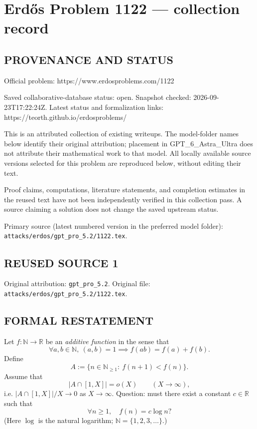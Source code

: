 \section*{Erd\H{o}s Problem 1122 --- collection record}

\subsection*{PROVENANCE AND STATUS}
Official problem: https://www.erdosproblems.com/1122

Saved collaborative-database status: open.
Snapshot checked: 2026-09-23T17:22:24Z.
Latest status and formalization links: https://teorth.github.io/erdosproblems/

This is an attributed collection of existing writeups. The model-folder names below identify their original attribution; placement in GPT\_6\_Astra\_Ultra does not attribute their mathematical work to that model. All locally available source versions selected for this problem are reproduced below, without editing their text.

Proof claims, computations, literature statements, and completion estimates in the reused text have not been independently verified in this collection pass. A source claiming a solution does not change the saved upstream status.

Primary source (latest numbered version in the preferred model folder): \texttt{attacks/erdos/gpt\_pro\_5.2/1122.tex}.

\subsection*{REUSED SOURCE 1}
Original attribution: \texttt{gpt\_pro\_5.2}.
Original file: \texttt{attacks/erdos/gpt\_pro\_5.2/1122.tex}.



\subsection*{FORMAL RESTATEMENT}
Let $f:\mathbb{N}\to\mathbb{R}$ be an \emph{additive function} in the sense that
\[
\forall a,b\in\mathbb{N},\ (a,b)=1 \implies f(ab)=f(a)+f(b).
\]
Define
\[
A:=\{n\in\mathbb{N}_{\ge 1}:\ f(n+1)<f(n)\}.
\]
Assume that
\[
\lvert A\cap[1,X]\rvert=o(X)\qquad (X\to\infty),
\]
i.e. $\lvert A\cap[1,X]\rvert/X\to 0$ as $X\to\infty$.
Question: must there exist a constant $c\in\mathbb{R}$ such that
\[
\forall n\ge 1,\quad f(n)=c\log n?
\]
(Here $\log$ is the natural logarithm; $\mathbb{N}=\{1,2,3,\dots\}$.)

